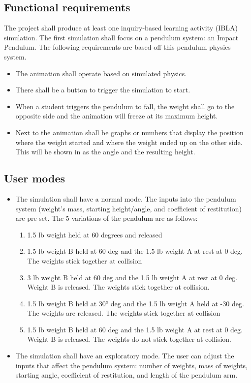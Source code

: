 \subsection{Functional requirements}
The project shall produce at least one inquiry-based learning activity (IBLA) simulation. The first simulation shall focus on a pendulum system: an Impact Pendulum. The following requirements are based off this pendulum physics system. 
\begin{itemize}
\item The animation shall operate based on simulated physics.
\item There shall be a button to trigger the simulation to start.
\item When a student triggers the pendulum to fall, the weight shall go to the opposite side and the animation will freeze at its maximum height.
\item Next to the animation shall be graphs or numbers that display the position where the weight started and where the weight ended up on the other side. This will be shown in as the angle and the resulting height. 
\end{itemize}
\subsection{User modes}
\begin{itemize}
\item The simulation shall have a normal mode. The inputs into the pendulum system (weight's mass, starting height/angle, and coefficient of restitution) are pre-set.
The 5 variations of the pendulum are as follows:
\begin{enumerate}
    \item 1.5 lb weight held at 60 degrees and released
    \item 1.5 lb weight B held at 60 deg and the 1.5 lb
weight A at rest at 0 deg. The weights stick together at collision
    \item 3 lb weight B held at 60 deg and the 1.5 lb weight A at rest at 0 deg. Weight B is released. The weights stick together at collision.
    \item 1.5 lb weight B held at 30° deg and the 1.5 lb weight A held at -30 deg. The weights are released. The weights stick together at collision
    \item 1.5 lb weight B held at 60 deg and the 1.5 lb weight A at rest at 0 deg. Weight B is released. The weights do not stick together at collision.
\end{enumerate}
\item The simulation shall have an exploratory mode. The user can adjust the inputs that affect the pendulum system:
number of weights, mass of weights, starting angle, coefficient of restitution, and length of the pendulum arm. 
\end{itemize}


